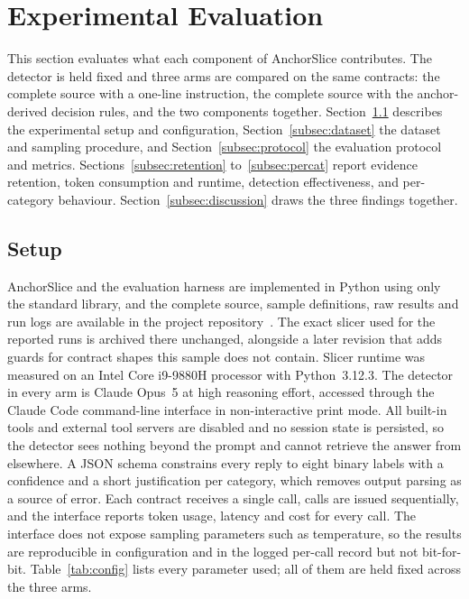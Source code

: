 \documentclass{ieeeaccess}
\begin{document}
\section{Experimental Evaluation}\label{sec:eval}
This section evaluates what each component of AnchorSlice contributes. The detector is held fixed and three arms are compared on the same contracts: the complete source with a one-line instruction, the complete source with the anchor-derived decision rules, and the two components together. Section~\ref{subsec:setup} describes the experimental setup and configuration, Section~\ref{subsec:dataset} the dataset and sampling procedure, and Section~\ref{subsec:protocol} the evaluation protocol and metrics. Sections~\ref{subsec:retention} to~\ref{subsec:percat} report evidence retention, token consumption and runtime, detection effectiveness, and per-category behaviour. Section~\ref{subsec:discussion} draws the three findings together.

\subsection{Setup}\label{subsec:setup}
AnchorSlice and the evaluation harness are implemented in Python using only the standard library, and the complete source, sample definitions, raw results and run logs are available in the project repository~\cite{anchorslice_repo}. The exact slicer used for the reported runs is archived there unchanged, alongside a later revision that adds guards for contract shapes this sample does not contain. Slicer runtime was measured on an Intel Core i9-9880H processor with Python~3.12.3. The detector in every arm is Claude Opus~5 at high reasoning effort, accessed through the Claude Code command-line interface in non-interactive print mode. All built-in tools and external tool servers are disabled and no session state is persisted, so the detector sees nothing beyond the prompt and cannot retrieve the answer from elsewhere. A JSON schema constrains every reply to eight binary labels with a confidence and a short justification per category, which removes output parsing as a source of error. Each contract receives a single call, calls are issued sequentially, and the interface reports token usage, latency and cost for every call. The interface does not expose sampling parameters such as temperature, so the results are reproducible in configuration and in the logged per-call record but not bit-for-bit. Table~\ref{tab:config} lists every parameter used; all of them are held fixed across the three arms.
\end{document}
